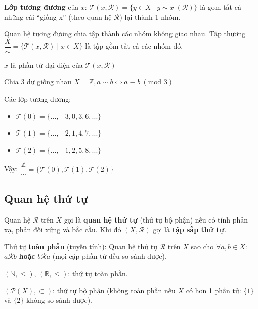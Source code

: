 \documentclass[12pt,a4paper]{article}
\begin{document}
\begin{dinhnghia}
  \textbf{Lớp tương đương} của $x$: $\mathcal{T}(x, \mathcal{R}) = \{y \in X \mid y \sim x \;(\mathcal{R})\}$ là gom tất cả những cái “giống x” (theo quan hệ $\mathcal{R}$) lại thành 1 nhóm.

  Quan hệ tương đương chia tập thành các nhóm không giao nhau. Tập thương $\dfrac{X}{\sim} = \{\mathcal{T}(x, \mathcal{R}) \mid x \in X\}$ là tập gồm tất cả các nhóm đó.

  $x$ là phần tử đại diện của $\mathcal{T}(x, \mathcal{R})$
\end{dinhnghia}

\begin{vidu}
    Chia 3 dư giống nhau $X = \mathbb{Z}, a \sim b \iff a \equiv b \ (\text{mod } 3)$
    
    Các lớp tương đương:
    \begin{itemize}
        \item $\mathcal{T}(0) = \{..., -3, 0, 3, 6, ...\}$
        \item $\mathcal{T}(1) = \{..., -2, 1, 4, 7, ...\}$
        \item $\mathcal{T}(2) = \{..., -1, 2, 5, 8, ...\}$
    \end{itemize}

    Vậy: $\dfrac{\mathbb{Z}}{\sim} = \{\mathcal{T}(0), \mathcal{T}(1), \mathcal{T}(2)\}$
\end{vidu}

\subsection{Quan hệ thứ tự}

\begin{dinhnghia}
  Quan hệ $\mathcal{R}$ trên $X$ gọi là \textbf{quan hệ thứ tự} (thứ tự bộ phận) nếu có tính phản xạ, phản đối xứng và bắc cầu. Khi đó $(X, \mathcal{R})$ gọi là \textbf{tập sắp thứ tự}.
\end{dinhnghia}

\begin{dinhnghia}
  Thứ tự \textbf{toàn phần} (tuyến tính): Quan hệ thứ tự $\mathcal{R}$ trên $X$ sao cho $\forall a, b \in X$: $a \mathcal{R} b$ \textbf{hoặc} $b \mathcal{R} a$ (mọi cặp phần tử đều so sánh được).
\end{dinhnghia}

\begin{vidu}
  $(\mathbb{N}, \le)$, $(\mathbb{R}, \le)$: thứ tự toàn phần. 
  
  $(\mathcal{P}(X), \subset)$: thứ tự bộ phận (không toàn phần nếu $X$ có hơn 1 phần tử: $\{1\}$ và $\{2\}$ không so sánh được).
\end{vidu}
\end{document}
